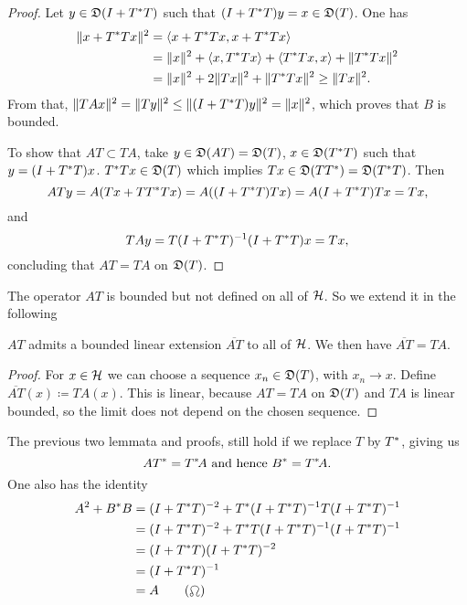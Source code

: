 \begin{proof}
 Let $y \in \mathfrak{D}(I + T ^{*} T)$ such that $(I + T ^{*} T)y = x \in \mathfrak{D}(T)$. One has 
 \begin{align*}
   \|x + T ^{*} T x\|^2 &= \left\langle x + T ^{*} T x, x + T ^{*} T x \right\rangle\\
   &= \|x\|^2 +  \left\langle x, T ^{*} Tx \right\rangle + \left\langle T ^{*} Tx, x \right\rangle+ \|T ^{*} Tx\|^2\\
   &= \|x\|^2 + 2\|Tx\|^2 + \|T ^{*} Tx\|^2 \geq \|Tx\|^2.
 \end{align*}
From that, $\| TAx\|^2 = \| Ty \| ^2 \leq \| (I + T ^{*} T)y \|^2 = \| x \| ^2$, which proves that $B$ is bounded. 

To show that $AT \subset TA$, take $y \in \mathfrak{D}(AT) = \mathfrak{D}(T)$, $x \in \mathfrak{D}(T ^{*} T)$ such that $y = ( I +  T ^{*} T)x$. $T ^{*} T x \in \mathfrak{D}(T)$ which implies $Tx \in \mathfrak{D}(TT^{*}) = \mathfrak{D}(T^{*} T)$. Then 
\[
 ATy = A(Tx + T T^{*} T x) = A((I + T^{*} T)Tx)= A(I+ T^{*} T)Tx= Tx,
\]
and
\[
 TAy= T(I+ T^{*} T)^{-1} (I + T ^{*} T)x=Tx,
\]
concluding that $AT = TA$ on $\mathfrak{D}(T)$.

\end{proof}

The operator $AT$ is bounded but not defined on all of $\mathcal{H}$. So we extend it in the following

\begin{lem}
 $AT$ admits a bounded linear extension $\overline{AT}$ to all of $\mathcal{H}$. We then have $\overline{AT}=TA$.
\end{lem}

\begin{proof}
 For $x \in \mathcal{H}$ we can choose a sequence $x_n \in \mathfrak{D}(T)$, with $x_n \rightarrow x$. Define $\overline{AT}(x) \coloneqq TA(x)$. This is linear, because $AT = TA$ on $\mathfrak{D}(T)$ and $TA$ is linear bounded, so the limit does not depend on the chosen sequence.
\end{proof}

\begin{rem}
 The previous two lemmata and proofs, still hold if we replace $T$ by $T^{*}$, giving us 
 \[
  AT^{*} = T^{*} \! A \text{ and hence } B^{*} = T^{*} \! A.
 \]
 One also has the identity
 \begin{align*}
  A^2 + B^{*} B &= (I + T^{*} T)^{-2} + T ^{*} (I + T^{*} T)^{-1} T (I + T^{*} T) ^{-1} \\
		&= (I + T^{*} T)^{-2} + T ^{*} T(I + T^{*} T)^{-1} (I + T^{*} T) ^{-1} \\
		&= (I + T^{*} T)(I + T^{*} T)^{-2} \\
		&= (I + T^{*} T)^{-1}  \\
		&= A \tag{\leo}
  \end{align*}
  

\end{rem}

